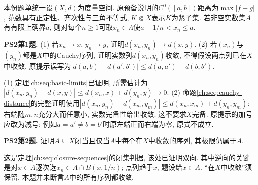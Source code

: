 本份题单统一设$(X,d)$为度量空间. 原预备说明的$C^0([a,b])$距离为$\max|f-g|$, 范数具有正定性、齐次性与三角不等式, $K\Subset X$表示$K$为紧子集. 若非空实数集$A$有有限上确界$a$, 则对每个$n\ge1$可取$x_n\in A$使$a-1/n<x_n\le a$.

\begin{exercise}\label{ps190:2:1}
\textbf{PS2第1题.} (1) 若$x_n\to x$, $y_n\to y$, 证明$d(x_n,y_n)\to d(x,y)$. (2) 若$(x_n)$与$(y_n)$都是$X$中的Cauchy序列, 证明实数列$d(x_n,y_n)$收敛, 不得假设两点列已在$X$中收敛. 原提示误写为$|d(a,b)+d(a',b')|\le d(a,a')+d(b,b')$.
\end{exercise}
\begin{solution}
(1) 定理\ref{ch:seq:basic-limits}已证明, 所需估计为$|d(x_n,y_n)-d(x,y)|\le d(x_n,x)+d(y_n,y)\to0$. (2) 命题\ref{ch:seq:cauchy-distance}的完整证明使用$|d(x_n,y_n)-d(x_m,y_m)|\le d(x_n,x_m)+d(y_n,y_m)$: 右端随$m,n$充分大而任意小, 实数完备性给出收敛. 这不要求$X$完备. 原提示的加号应改为减号; 例如$a=a'\ne b=b'$时原左端正而右端为零, 原式不成立.
\end{solution}

\begin{exercise}\label{ps190:2:2}
\textbf{PS2第2题.} 证明$A\subseteq X$闭当且仅当$A$中每个在$X$中收敛的序列, 其极限仍属于$A$.
\end{exercise}
\begin{solution}
这是定理\ref{ch:seq:closure-sequences}的闭集判据, 该处已证明双向. 其中逆向的关键是对$x\in\overline A$逐次选$x_n\in A\cap B(x,1/n)$; 点列趋于$x$, 题设给$x\in A$. “在$X$中收敛”须保留, 本题并未断言$A$中的所有序列都收敛.
\end{solution}

